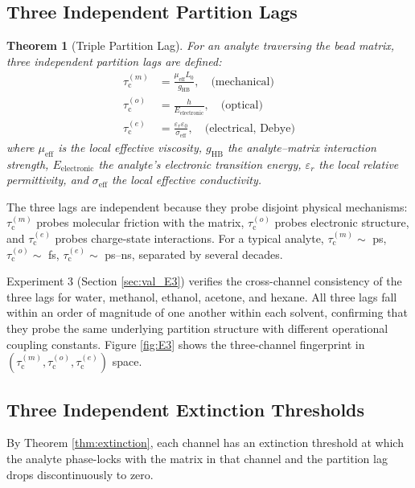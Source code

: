 \documentclass[twocolumn,10pt,a4paper]{article}
\newtheorem{theorem}{Theorem}[section]
\theoremstyle{definition}
\theoremstyle{remark}
\newcommand{\tauM}{\tau_{\mathrm{c}}^{(m)}}
\newcommand{\tauO}{\tau_{\mathrm{c}}^{(o)}}
\newcommand{\tauE}{\tau_{\mathrm{c}}^{(e)}}
\begin{document}
\subsection{Three Independent Partition Lags}

\begin{theorem}[Triple Partition Lag]
\label{thm:triple_lag}
For an analyte traversing the bead matrix, three independent partition lags are defined:
\begin{align}
\tauM &= \frac{\mu_{\mathrm{eff}} L_0}{g_{\mathrm{HB}}}, \quad \text{(mechanical)}\\
\tauO &= \frac{h}{E_{\mathrm{electronic}}}, \quad \text{(optical)}\\
\tauE &= \frac{\varepsilon_r \varepsilon_0}{\sigma_{\mathrm{eff}}}, \quad \text{(electrical, Debye)}
\end{align}
where $\mu_{\mathrm{eff}}$ is the local effective viscosity, $g_{\mathrm{HB}}$ the analyte--matrix interaction strength, $E_{\mathrm{electronic}}$ the analyte's electronic transition energy, $\varepsilon_r$ the local relative permittivity, and $\sigma_{\mathrm{eff}}$ the local effective conductivity.
\end{theorem}

The three lags are independent because they probe disjoint physical mechanisms: $\tauM$ probes molecular friction with the matrix, $\tauO$ probes electronic structure, and $\tauE$ probes charge-state interactions. For a typical analyte, $\tauM \sim$ ps, $\tauO \sim$ fs, $\tauE \sim$ ps--ns, separated by several decades.

Experiment 3 (Section \ref{sec:val_E3}) verifies the cross-channel consistency of the three lags for water, methanol, ethanol, acetone, and hexane. All three lags fall within an order of magnitude of one another within each solvent, confirming that they probe the same underlying partition structure with different operational coupling constants. Figure \ref{fig:E3} shows the three-channel fingerprint in $(\tauM, \tauO, \tauE)$ space.

\subsection{Three Independent Extinction Thresholds}

By Theorem \ref{thm:extinction}, each channel has an extinction threshold at which the analyte phase-locks with the matrix in that channel and the partition lag drops discontinuously to zero.
\end{document}
